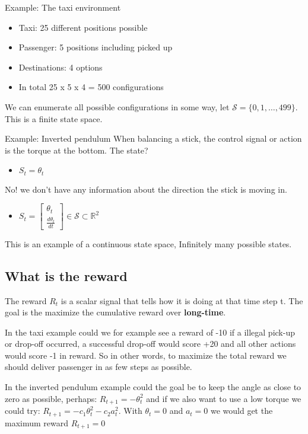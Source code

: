 \begin{example}{Example: The taxi environment}
\begin{itemize}
	\item Taxi: 25 different positions possible 
	\item Passenger: 5 positions including picked up
	\item Destinations: 4 options
	\item In total 25 x 5 x 4 = 500 configurations
\end{itemize}
We can enumerate all possible configurations in some way, let $\mathcal{S} = \{ 0,1, \ldots, 499\}$. This is a finite state space. 
\end{example}	

\begin{example}{Example: Inverted pendulum}
When balancing a stick, the control signal or action is the torque at the bottom. The state? 
\begin{itemize}
	\item $S_t = \theta_t$
\end{itemize}
No! we don't have any information about the direction the stick is moving in.

\begin{itemize}
 	\item $S_t = \begin{bmatrix} \theta_t \\ \frac{d \theta_t} {dt}  \end{bmatrix} \in \mathcal{S} \subset \mathbb{R}^{2} $
 \end{itemize} 
 This is an example of a continuous state space, Infinitely many possible states.

\end{example}	


\subsection{What is the reward}
The reward $R_t$ is a scalar signal that tells how it is doing at that time step t. The goal is the maximize the cumulative reward over \textbf{long-time}. 

In the taxi example could we for example see a reward of -10 if a illegal pick-up or drop-off occurred, a successful drop-off would score +20 and all other actions would score -1 in reward. So in other words, to maximize the total reward we should deliver passenger in as few steps as possible. 

In the inverted pendulum example could the goal be to keep the angle as close to zero as possible, perhaps: $R_{t+1} = - \theta_t^{2}$ and if we also want to use a low torque we could try: $R_{t+1} = -c_1\theta_t^{2} - c_2a_t^{2}$. With $\theta_t = 0$ and $a_t = 0$ we would get the maximum reward $R_{t+1} = 0$


